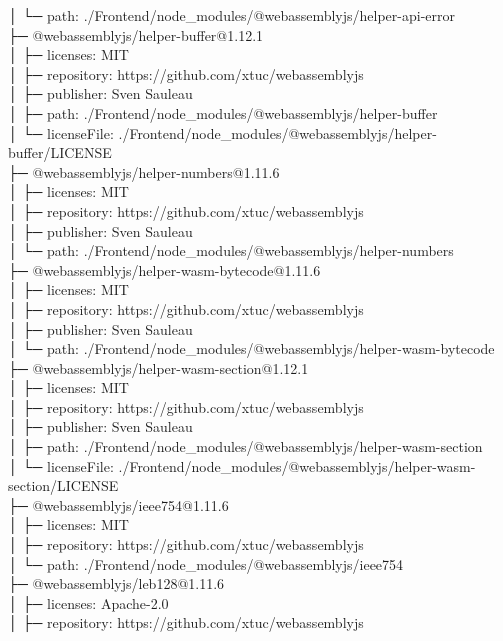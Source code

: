 │  └─ path: ./Frontend/node\_modules/@webassemblyjs/helper-api-error\\
├─ @webassemblyjs/helper-buffer@1.12.1\\
│  ├─ licenses: MIT\\
│  ├─ repository: https://github.com/xtuc/webassemblyjs\\
│  ├─ publisher: Sven Sauleau\\
│  ├─ path: ./Frontend/node\_modules/@webassemblyjs/helper-buffer\\
│  └─ licenseFile: ./Frontend/node\_modules/@webassemblyjs/helper-buffer/LICENSE\\
├─ @webassemblyjs/helper-numbers@1.11.6\\
│  ├─ licenses: MIT\\
│  ├─ repository: https://github.com/xtuc/webassemblyjs\\
│  ├─ publisher: Sven Sauleau\\
│  └─ path: ./Frontend/node\_modules/@webassemblyjs/helper-numbers\\
├─ @webassemblyjs/helper-wasm-bytecode@1.11.6\\
│  ├─ licenses: MIT\\
│  ├─ repository: https://github.com/xtuc/webassemblyjs\\
│  ├─ publisher: Sven Sauleau\\
│  └─ path: ./Frontend/node\_modules/@webassemblyjs/helper-wasm-bytecode\\
├─ @webassemblyjs/helper-wasm-section@1.12.1\\
│  ├─ licenses: MIT\\
│  ├─ repository: https://github.com/xtuc/webassemblyjs\\
│  ├─ publisher: Sven Sauleau\\
│  ├─ path: ./Frontend/node\_modules/@webassemblyjs/helper-wasm-section\\
│  └─ licenseFile: ./Frontend/node\_modules/@webassemblyjs/helper-wasm-section/LICENSE\\
├─ @webassemblyjs/ieee754@1.11.6\\
│  ├─ licenses: MIT\\
│  ├─ repository: https://github.com/xtuc/webassemblyjs\\
│  └─ path: ./Frontend/node\_modules/@webassemblyjs/ieee754\\
├─ @webassemblyjs/leb128@1.11.6\\
│  ├─ licenses: Apache-2.0\\
│  ├─ repository: https://github.com/xtuc/webassemblyjs\\
